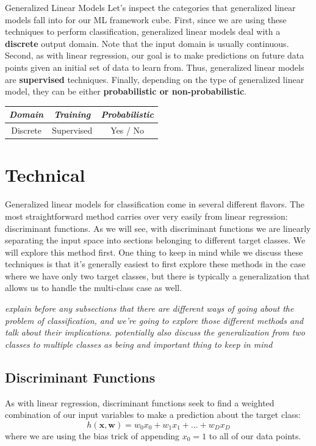 \begin{mlcube}{Generalized Linear Models}
Let's inspect the categories that generalized linear models fall into for our ML framework cube. First, since we are using these techniques to perform classification, generalized linear models deal with a \textbf{discrete} output domain. Note that the input domain is usually continuous. Second, as with linear regression, our goal is to make predictions on future data points given an initial set of data to learn from. Thus, generalized linear models are \textbf{supervised} techniques. Finally, depending on the type of generalized linear model, they can be either \textbf{probabilistic or non-probabilistic}.
\begin{center}
    \begin{tabular}{c|c|c}
    \textit{\textbf{Domain}} & \textit{\textbf{Training}} & \textit{\textbf{Probabilistic}} \\
    \hline
    Discrete & Supervised & Yes / No \\
    \end{tabular}
\end{center}
\end{mlcube}

\section{Technical}
Generalized linear models for classification come in several different flavors. The most straightforward method carries over very easily from linear regression: discriminant functions. As we will see, with discriminant functions we are linearly separating the input space into sections belonging to different target classes. We will explore this method first. One thing to keep in mind while we discuss these techniques is that it's generally easiest to first explore these methods in the case where we have only two target classes, but there is typically a generalization that allows us to handle the multi-class case as well.

\textit{explain before any subsections that there are different ways of going about the problem of classification, and we're going to explore those different methods and talk about their implications. potentially also discuss the generalization from two classes to multiple classes as being and important thing to keep in mind}

\subsection{Discriminant Functions}
As with linear regression, discriminant functions seek to find a weighted combination of our input variables to make a prediction about the target class:
\begin{equation} \label{basic-discriminant-fn}
	h(\textbf{x}, \textbf{w}) = w_{0}x_{0} + w_{1}x_{1} + ... + w_{D}x_{D}
\end{equation}
where we are using the bias trick of appending $x_{0} = 1$ to all of our data points.

